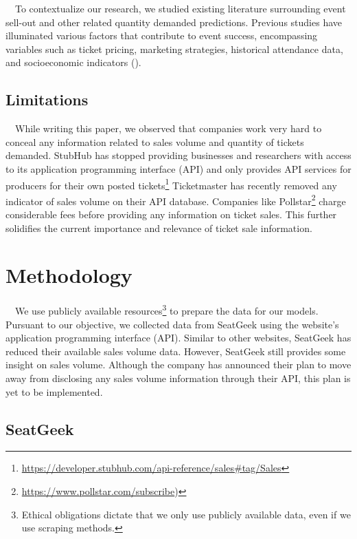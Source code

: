 \documentclass[
]{article}
\begin{document}
~~To contextualize our research, we studied existing literature
surrounding event sell-out and other related quantity demanded
predictions. Previous studies have illuminated various factors that
contribute to event success, encompassing variables such as ticket
pricing, marketing strategies, historical attendance data, and
socioeconomic indicators (\citet{krueger2005}).

\hypertarget{limitations}{%
\subsection{Limitations}\label{limitations}}

~~While writing this paper, we observed that companies work very hard to
conceal any information related to sales volume and quantity of tickets
demanded. StubHub has stopped providing businesses and researchers with
access to its application programming interface (API) and only provides
API services for producers for their own posted tickets\footnote{\url{https://developer.stubhub.com/api-reference/sales\#tag/Sales}}
Ticketmaster has recently removed any indicator of sales volume on their
API database. Companies like Pollstar\footnote{\url{https://www.pollstar.com/subscribe})}
charge considerable fees before providing any information on ticket
sales. This further solidifies the current importance and relevance of
ticket sale information.

\hypertarget{methodology}{%
\section{\texorpdfstring{\textbf{Methodology}}{Methodology}}\label{methodology}}

~~We use publicly available resources\footnote{Ethical obligations
  dictate that we only use publicly available data, even if we use
  scraping methods.} to prepare the data for our models. Pursuant to our
objective, we collected data from SeatGeek using the website's
application programming interface (API). Similar to other websites,
SeatGeek has reduced their available sales volume data. However,
SeatGeek still provides some insight on sales volume. Although the
company has announced their plan to move away from disclosing any sales
volume information through their API, this plan is yet to be
implemented.

\hypertarget{seatgeek}{%
\subsection{SeatGeek}\label{seatgeek}}
\end{document}
